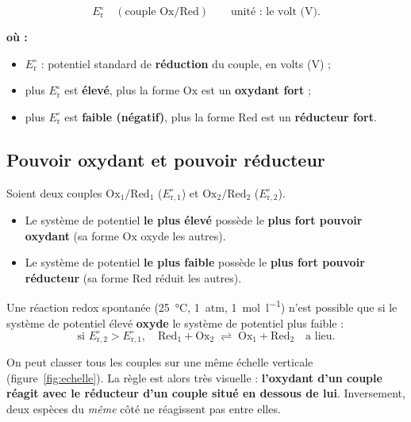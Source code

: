 \documentclass[11pt,a4paper]{article}
\newenvironment{ou}{%
  \par\smallskip\noindent\textbf{où :}\nopagebreak
  \begin{itemize}[leftmargin=1.8em,topsep=2pt,itemsep=1.5pt,parsep=0pt]}%
  {\end{itemize}}
\begin{document}
\begin{formule}
\[
E_{\mathrm{r}}^{\circ}\quad(\text{couple }\mathrm{Ox}/\mathrm{Red})\qquad\text{unité : le volt (V).}
\]
\begin{ou}
  \item $E_{\mathrm{r}}^{\circ}$ : potentiel standard de \textbf{réduction} du couple, en volts (V) ;
  \item plus $E_{\mathrm{r}}^{\circ}$ est \textbf{élevé}, plus la forme $\mathrm{Ox}$ est un
        \textbf{oxydant fort} ;
  \item plus $E_{\mathrm{r}}^{\circ}$ est \textbf{faible (négatif)}, plus la forme $\mathrm{Red}$
        est un \textbf{réducteur fort}.
\end{ou}
\end{formule}

\subsection{Pouvoir oxydant et pouvoir réducteur}

\begin{theoreme}
Soient deux couples $\mathrm{Ox_1}/\mathrm{Red_1}$ ($E_{\mathrm{r,1}}^{\circ}$) et
$\mathrm{Ox_2}/\mathrm{Red_2}$ ($E_{\mathrm{r,2}}^{\circ}$).
\begin{itemize}[leftmargin=1.6em,topsep=1pt,itemsep=2pt]
  \item Le système de potentiel \textbf{le plus élevé} possède le \textbf{plus fort pouvoir oxydant}
        (sa forme $\mathrm{Ox}$ oxyde les autres).
  \item Le système de potentiel \textbf{le plus faible} possède le \textbf{plus fort pouvoir
        réducteur} (sa forme $\mathrm{Red}$ réduit les autres).
\end{itemize}
Une réaction redox spontanée (\SI{25}{\celsius}, \SI{1}{atm}, \SI{1}{mol\per\litre}) n'est possible
que si le système de potentiel élevé \textbf{oxyde} le système de potentiel plus faible :
\[
\text{si }E_{\mathrm{r,2}}^{\circ}>E_{\mathrm{r,1}}^{\circ},\quad
\mathrm{Red_1}+\mathrm{Ox_2}\;\rightleftharpoons\;\mathrm{Ox_1}+\mathrm{Red_2}\quad\text{a lieu.}
\]
\end{theoreme}

\begin{remarque}
On peut classer tous les couples sur une même \og échelle\fg{} verticale (figure~\ref{fig:echelle}).
La règle est alors très visuelle : \textbf{l'oxydant d'un couple réagit avec le réducteur d'un
couple situé en dessous de lui}. Inversement, deux espèces du \emph{même} côté ne réagissent pas
entre elles.
\end{remarque}
\end{document}
